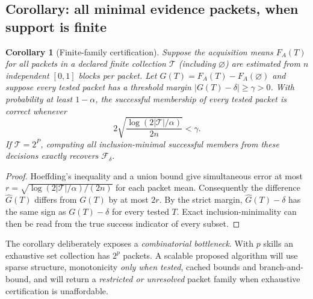 \documentclass[11pt,a4paper]{article}
\newcommand{\F}{\mathcal{F}}\newcommand{\D}{\mathcal{D}}
\newtheorem{corollary}[theorem]{Corollary}
\theoremstyle{definition}\newtheorem{definition}[theorem]{Definition}
\theoremstyle{remark}\newtheorem{remark}[theorem]{Remark}
\begin{document}
\subsection{Corollary: all minimal evidence packets, when support is finite}\label{sec:packetthm}
\begin{corollary}[Finite-family certification]\label{cor:minimal}
Suppose the acquisition means $F_A(T)$ for all packets in a declared finite collection $\mathcal T$ (including $\varnothing$) are estimated from $n$ independent $[0,1]$ blocks per packet. Let $G(T)=F_A(T)-F_A(\varnothing)$ and suppose every tested packet has a \emph{threshold margin} $|G(T)-\delta|\ge\gamma>0$. With probability at least $1-\alpha$, the successful membership of \emph{every} tested packet is correct whenever
\[
 2\sqrt{\frac{\log(2|\mathcal T|/\alpha)}{2n}}<\gamma.
\]
If $\mathcal T=2^P$, computing all inclusion-minimal successful members from these decisions exactly recovers $\F_\delta$.
\end{corollary}
\begin{proof}
Hoeffding's inequality and a union bound give simultaneous error at most $r=\sqrt{\log(2|\mathcal T|/\alpha)/(2n)}$ for each packet mean. Consequently the difference $\widehat G(T)$ differs from $G(T)$ by at most $2r$. By the strict margin, $\widehat G(T)-\delta$ has the same sign as $G(T)-\delta$ for every tested $T$. Exact inclusion-minimality can then be read from the true success indicator of every subset.\qedhere
\end{proof}
The corollary deliberately exposes a \emph{combinatorial bottleneck}. With $p$ skills an exhaustive set collection has $2^p$ packets. A scalable proposed algorithm will use sparse structure, monotonicity \emph{only when tested}, cached bounds and branch-and-bound, and will return a \emph{restricted or unresolved} packet family when exhaustive certification is unaffordable.
\end{document}
